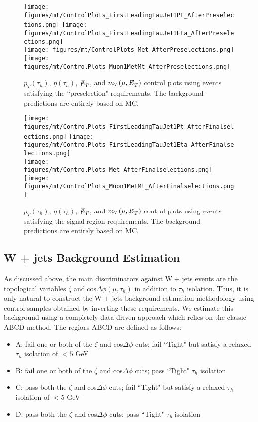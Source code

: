 \begin{figure}\centering
  \texttt{[image: figures/mt/ControlPlots\_FirstLeadingTauJet1Pt\_AfterPreselections.png]}
  \texttt{[image: figures/mt/ControlPlots\_FirstLeadingTauJet1Eta\_AfterPreselections.png]} \\
  \texttt{[image: figures/mt/ControlPlots\_Met\_AfterPreselections.png]}
  \texttt{[image: figures/mt/ControlPlots\_Muon1MetMt\_AfterPreselections.png]}
  \caption{\label{fig:muTauPreselectionControlPlots} $p_{T}(\tau_{h})$, $\eta(\tau_{h})$, ${\not\mathrel{E}}_T$, and $m_{T}(\mu,{\not\mathrel{E}}_T)$ control plots using events satisfying the 
``preselection" requirements. The background predictions are entirely based on MC.}
\end{figure}

\begin{figure}\centering
  \texttt{[image: figures/mt/ControlPlots\_FirstLeadingTauJet1Pt\_AfterFinalselections.png]}
  \texttt{[image: figures/mt/ControlPlots\_FirstLeadingTauJet1Eta\_AfterFinalselections.png]} \\
  \texttt{[image: figures/mt/ControlPlots\_Met\_AfterFinalselections.png]}
  \texttt{[image: figures/mt/ControlPlots\_Muon1MetMt\_AfterFinalselections.png]}
  \caption{\label{fig:muTauFinalselectionControlPlots} $p_{T}(\tau_{h})$, $\eta(\tau_{h})$, ${\not\mathrel{E}}_T$, and $m_{T}(\mu,{\not\mathrel{E}}_T)$ control plots using events satisfying 
the signal region requirements. The background predictions are entirely based on MC.}
\end{figure}

\subsection{W + jets Background Estimation}

As discussed above, the main discriminators against W + jets events are the topological variables $\zeta$ and cos$\Delta\phi(\mu,\tau_{h})$ in addition to 
$\tau_{h}$ isolation. Thus, it is only natural to construct the W + jets background estimation methodology using control samples obtained by inverting these 
requirements. We estimate this background using a completely data-driven approach which relies on the classic ABCD method. The regions ABCD are defined as 
follows:

\begin{itemize}
  \item A: fail one or both of the $\zeta$ and cos$\Delta\phi$ cuts; fail ``Tight" but satisfy a relaxed $\tau_{h}$ isolation of $< 5$ GeV
  \item B: fail one or both of the $\zeta$ and cos$\Delta\phi$ cuts; pass ``Tight" $\tau_{h}$ isolation
  \item C: pass both the $\zeta$ and cos$\Delta\phi$ cuts; fail ``Tight" but satisfy a relaxed $\tau_{h}$ isolation of $< 5$ GeV
  \item D: pass both the $\zeta$ and cos$\Delta\phi$ cuts; pass ``Tight" $\tau_{h}$ isolation
\end{itemize}

